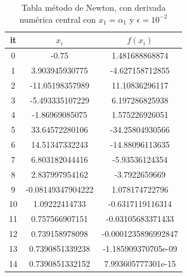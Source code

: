 \documentclass{article} %
\begin{document}
\begin{table}
\centering
\begin{tabular}{|c|c|c|}
\hline
it & $x_i$ & $f(x_i)$\\
\hline
0 & -0.75 & 1.481688868874\\
1 & 3.903945930775 & -4.627158712855\\
2 & -11.05198357989 & 11.10836296117\\
3 & -5.493335107229 & 6.197286825938\\
4 & -1.86969085075 & 1.575226926051\\
5 & 33.64572280106 & -34.25804930566\\
6 & 14.51347332243 & -14.88096113635\\
7 & 6.803182044416 & -5.93536124354\\
8 & 2.837997954162 & -3.7922659669\\
9 & -0.08149347904222 & 1.078174722796\\
10 & 1.09222414733 & -0.6317119116314\\
11 & 0.757566907151 & -0.03105683371433\\
12 & 0.739158978098 & -0.0001235896992847\\
13 & 0.7390851339238 & -1.185909370705e-09\\
14 & 0.7390851332152 & 7.993605777301e-15\\
\hline
\end{tabular}
\caption{Tabla método de Newton, con derivada numérica central con $x_1 = \alpha_1$ y $\epsilon = 10^{-2}$}
\end{table}
\end{document}
